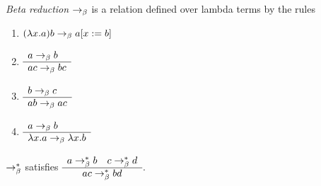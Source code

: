 \documentclass{article}
\begin{document}
\begin{definition} \emph{Beta reduction} $\to_\beta$ is a relation defined over lambda
  terms by the rules
  \begin{enumerate}
  \item $(\lambda x.a) b \to_\beta a[x := b]$
  \item $\begin{array}{l} a\to_\beta b \\ \hline a c \to_\beta b c\end{array}$
  \item $\begin{array}{l} b\to_\beta c \\ \hline a b \to_\beta a c\end{array}$
  \item $\begin{array}{l} a \to_\beta b \\ \hline \lambda x.a \to_\beta \lambda x.b\end{array}$
  \end{enumerate}
\end{definition}







\begin{theorem}
  $\to^*_\beta$ satisfies
  $\begin{array}{c} 
    a\to^*_\beta b \quad
    c \to^*_\beta d \\ \hline ac \to^*_\beta bd\end{array}$.


\end{theorem}
\end{document}

